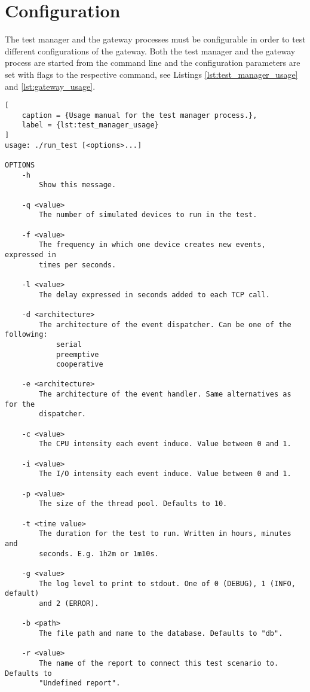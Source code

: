 \section{Configuration}
\label{sec:configuration}

The test manager and the gateway processes must be configurable in order to
test different configurations of the gateway. Both the test manager and the
gateway process are started from the command line and the configuration
parameters are set with flags to the respective command, see Listings
\ref{lst:test_manager_usage} and \ref{lst:gateway_usage}.

\begin{lstlisting}[
    caption = {Usage manual for the test manager process.},
    label = {lst:test_manager_usage}
]
usage: ./run_test [<options>...]

OPTIONS
    -h
        Show this message.

    -q <value>
        The number of simulated devices to run in the test.

    -f <value>
        The frequency in which one device creates new events, expressed in
        times per seconds.

    -l <value>
        The delay expressed in seconds added to each TCP call.

    -d <architecture>
        The architecture of the event dispatcher. Can be one of the following:
            serial
            preemptive
            cooperative

    -e <architecture>
        The architecture of the event handler. Same alternatives as for the
        dispatcher.

    -c <value>
        The CPU intensity each event induce. Value between 0 and 1.

    -i <value>
        The I/O intensity each event induce. Value between 0 and 1.

    -p <value>
        The size of the thread pool. Defaults to 10.

    -t <time value>
        The duration for the test to run. Written in hours, minutes and
        seconds. E.g. 1h2m or 1m10s.

    -g <value>
        The log level to print to stdout. One of 0 (DEBUG), 1 (INFO, default)
        and 2 (ERROR).

    -b <path>
        The file path and name to the database. Defaults to "db".

    -r <value>
        The name of the report to connect this test scenario to. Defaults to
        "Undefined report".
\end{lstlisting}

